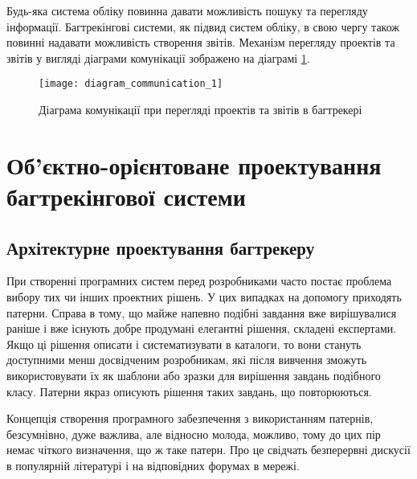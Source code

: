 \documentclass[../main.tex]{subfiles}
\begin{document}
		Будь-яка система обліку повинна давати можливість пошуку та перегляду інформації. Багтрекінгові системи, як підвид систем обліку, в свою чергу також повинні надавати можливість створення звітів. Механізм перегляду проектів та звітів у вигляді діаграми комунікації зображено на діаграмі \ref{figure_diag_comm_1}.
		
		\begin{figure}[H]
			\centering
			\texttt{[image: diagram\_communication\_1]}
			\caption{Діаграма комунікації при перегляді проектів та звітів в багтрекері}
			\label{figure_diag_comm_1}
		\end{figure}

\section{Об’єктно-орієнтоване проектування багтрекінгової системи}

	\subsection{Архітектурне проектування багтрекеру}
	
		При створенні програмних систем перед розробниками часто постає проблема вибору тих чи інших проектних рішень. У цих випадках на допомогу приходять патерни. Справа в тому, що майже напевно подібні завдання вже вирішувалися раніше і вже існують добре продумані елегантні рішення, складені експертами. Якщо ці рішення описати і систематизувати в каталоги, то вони стануть доступними менш досвідченим розробникам, які після вивчення зможуть використовувати їх як шаблони або зразки для вирішення завдань подібного класу. Патерни якраз описують рішення таких завдань, що повторюються.~\cite{uml_patterns}
		
		Концепція створення програмного забезпечення з використанням патернів, безсумнівно, дуже важлива, але відносно молода, можливо, тому до цих пір немає чіткого визначення, що ж таке патерн. Про це свідчать безперервні дискусії в популярній літературі і на відповідних форумах в мережі.
		
		
\end{document}
